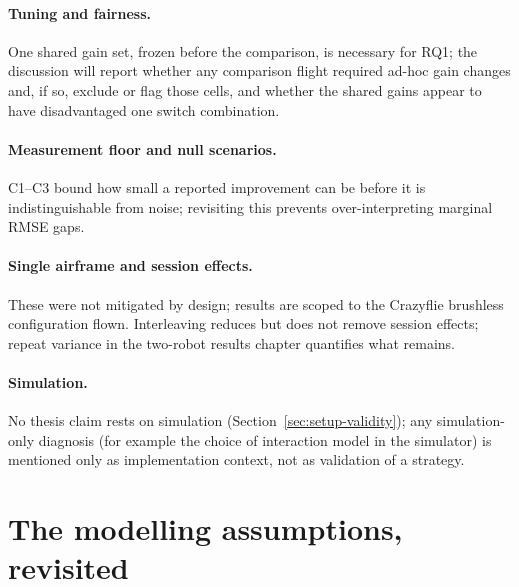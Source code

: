 \paragraph{Tuning and fairness.} One shared gain set, frozen before the comparison, is necessary for
RQ1; the discussion will report whether any comparison flight required ad-hoc gain changes and, if
so, exclude or flag those cells, and whether the shared gains appear to have disadvantaged one
switch combination.

\paragraph{Measurement floor and null scenarios.} C1--C3 bound how small a reported improvement can
be before it is indistinguishable from noise; revisiting this prevents over-interpreting marginal
RMSE gaps.

\paragraph{Single airframe and session effects.} These were not mitigated by design; results are
scoped to the Crazyflie brushless configuration flown. Interleaving reduces but does not remove
session effects; repeat variance in the two-robot results chapter quantifies what remains.

\paragraph{Simulation.} No thesis claim rests on simulation (Section~\ref{sec:setup-validity});
any simulation-only diagnosis (for example the choice of interaction model in the simulator) is
mentioned only as implementation context, not as validation of a strategy.


\section{The modelling assumptions, revisited}
\label{sec:disc-assumptions}

